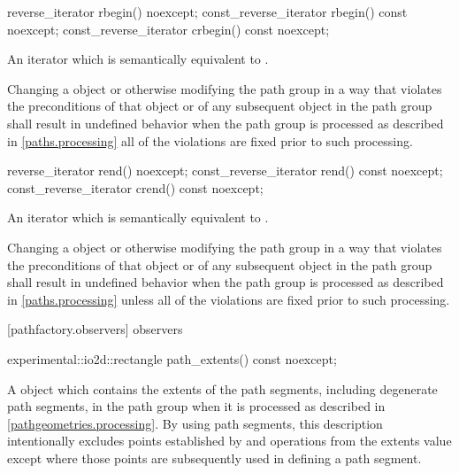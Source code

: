 \begin{itemdecl}
	reverse_iterator rbegin() noexcept;
	const_reverse_iterator rbegin() const noexcept;
	const_reverse_iterator crbegin() const noexcept;
\end{itemdecl}
\begin{itemdescr}
	\pnum
	\returns
	An iterator which is semantically equivalent to .
	
	\pnum
	\remarks
	Changing a  object or otherwise modifying the path group in a way that violates the preconditions of that  object or of any subsequent  object in the path group shall result in undefined behavior when the path group is processed as described in \ref{paths.processing} all of the violations are fixed prior to such processing.
\end{itemdescr}

\begin{itemdecl}
	reverse_iterator rend() noexcept;
	const_reverse_iterator rend() const noexcept;
	const_reverse_iterator crend() const noexcept;
\end{itemdecl}
\begin{itemdescr}
	\pnum
	\returns
	An iterator which is semantically equivalent to .
	
	\pnum
	\remarks
	Changing a  object or otherwise modifying the path group in a way that violates the preconditions of that  object or of any subsequent  object in the path group shall result in undefined behavior when the path group is processed as described in \ref{paths.processing} unless all of the violations are fixed prior to such processing.
\end{itemdescr}

 [pathfactory.observers] { observers}

\begin{itemdecl}
    experimental::io2d::rectangle path_extents() const noexcept;
\end{itemdecl}
\begin{itemdescr}
	\pnum
	\returns
	A  object which contains the extents of the path segments, including degenerate path segments, in the path group when it is processed as described in \ref{pathgeometries.processing}.
	\enternote
	By using path segments, this description intentionally excludes points established by  and  operations from the extents value except where those points are subsequently used in defining a path segment.
	\exitnote
\end{itemdescr}

